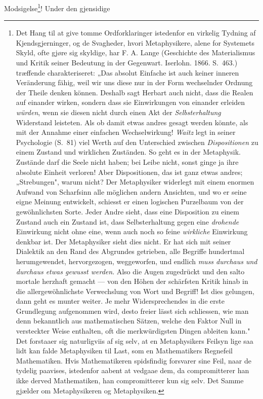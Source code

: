 \documentclass[12pt]{article}
\begin{document}
Modsigelse\footnote{Det Hang til at give tomme Ordforklaringer
istedenfor en virkelig Tydning af Kjendsgjerninger, og de
Svagheder, hvori Metaphysikere, alene for Systemets Skyld, ofte
gjøre sig skyldige, har F. A. Lange (Geschichte des Materialismus
und Kritik seiner Bedeutung in der Gegenwart. Iserlohn. 1866. S.\
463.) træffende charakteriseret: „Das absolut Einfache ist auch
keiner inneren Veränderung fähig, weil wir uns diese nur in der Form
wechselnder Ordnung der Theile denken können. Deshalb sagt Herbart
auch nicht, dass die Realen auf einander wirken, sondern dass sie
Einwirkungen von einander erleiden \emph{würden}, wenn sie diesen
nicht durch einen Akt der \emph{Selbsterhaltung} Widerstand
leisteten. Als ob damit etwas andres gesagt werden könnte, als mit
der Annahme einer einfachen Wechselwirkung! \emph{Waitz} legt in
seiner Psychologie (S.\ 81) viel Werth auf den Unterschied zwischen
\emph{Dispositionen} zu einem Zustand und wirklichen Zuständen. So
geht es in der Metaphysik. Zustände darf die Seele nicht haben; bei
Leibe nicht, sonst ginge ja ihre absolute Einheit verloren! Aber
Dispositionen, das ist ganz etwas andres; „Strebungen", warum
nicht? Der Metaphysiker widerlegt mit einem enormen Aufwand von
Scharfsinn alle möglichen andern Ansichten, und wo er seine eigne
Meinung entwickelt, schiesst er einen logischen Purzelbaum von der
gewöhnlichsten Sorte. Jeder Andre sieht, dass eine Disposition zu
einem Zustand auch ein Zustand ist, dass Selbsterhaltung gegen eine
\emph{drohende} Einwirkung nicht ohne eine, wenn auch noch so feine
\emph{wirkliche} Einwirkung denkbar ist. Der Metaphysiker sieht dies
nicht. Er hat sich mit seiner Dialektik an den Rand des Abgrundes
getrieben, alle Begriffe hundertmal herumgewendet, hervorgezogen,
weggeworfen, und endlich \emph{muss durchaus und durchaus etwas
gewusst werden}. Also die Augen zugedrückt und den salto
mortale herzhaft gemacht --- von den Höhen der schärfsten Kritik
hinab in die allergewöhnlichste Verwechslung von Wort und Begriff!
Ist dies gelungen, dann geht es munter weiter. Je mehr
Widersprechendes in die erste Grundlegung aufgenommen wird, desto
freier lässt sich schliessen, wie man denn bekanntlich aus
mathematischen Sätzen, welche den Faktor Null in versteckter Weise
enthalten, oft die merkwürdigsten Dingen ableiten kann." Det
forstaaer sig naturligviis af sig selv, at en Metaphysikers Feilsyn
lige saa lidt kan falde Metaphysiken til Last, som en Mathematikers
Regnefeil Mathematiken. Hvis Mathematikeren spidsfindig forsvarer
sine Feil, naar de tydelig paavises, istedenfor aabent at vedgaae
dem, da compromitterer han ikke derved Mathematiken, han
compromitterer kun sig selv. Det Samme gjælder om Metaphysikeren og
Metaphysiken.}! Under den gjensidige
\end{document}
